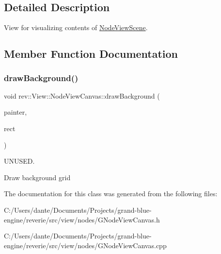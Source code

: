 \subsection{Detailed Description}
View for visualizing contents of \mbox{\hyperlink{classrev_1_1_view_1_1_node_view_scene}{Node\+View\+Scene}}. 

\subsection{Member Function Documentation}
\mbox{\label{classrev_1_1_view_1_1_node_view_canvas_afe051736b0d1ec212513026dae241b9c}} 
\subsubsection{\texorpdfstring{drawBackground()}{drawBackground()}}
{\footnotesize\ttfamily void rev\+::\+View\+::\+Node\+View\+Canvas\+::draw\+Background (\begin{DoxyParamCaption}\item[{Q\+Painter $\ast$}]{painter,  }\item[{const Q\+RectF \&}]{rect }\end{DoxyParamCaption})}



U\+N\+U\+S\+ED. 

Draw background grid 

The documentation for this class was generated from the following files\+:\begin{DoxyCompactItemize}
\item 
C\+:/\+Users/dante/\+Documents/\+Projects/grand-\/blue-\/engine/reverie/src/view/nodes/G\+Node\+View\+Canvas.\+h\item 
C\+:/\+Users/dante/\+Documents/\+Projects/grand-\/blue-\/engine/reverie/src/view/nodes/G\+Node\+View\+Canvas.\+cpp\end{DoxyCompactItemize}
